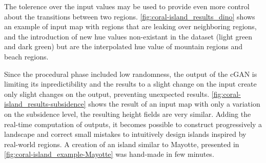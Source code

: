 The tolerence over the input values may be used to provide even more control about the transitions between two regions. \cref{fig:coral-island_results_dino} shows an example of input map with regions that are leaking over neighboring regions, and the introduction of new hue values non-existant in the dataset (light green and dark green) but are the interpolated hue value of mountain regions and beach regions.

Since the procedural phase included low randomness, the output of the cGAN is limiting its inpredictibility and the results to a slight change on the input create only slight changes on the output, preventing unexpected results. \cref{fig:coral-island_results-subsidence} shows the result of an input map with only a variation on the subsidence level, the resulting height fields are very similar. Adding the real-time computation of outputs, it becomes possible to construct progressively a landscape and correct small mistakes to intuitively design islands inspired by real-world regions. A creation of an island similar to Mayotte, presented in \cref{fig:coral-island_example-Mayotte} was hand-made in few minutes. 


